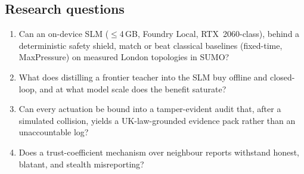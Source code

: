 \subsection{Research questions}\label{sec:intro-rqs}
\begin{enumerate}
\item[\textbf{RQ1}] Can an on-device SLM ($\le$4\,GB, Foundry Local,
RTX~2060-class), behind a deterministic safety shield, match or beat
classical baselines (fixed-time, MaxPressure) on measured London
topologies in SUMO?
\item[\textbf{RQ2}] What does distilling a frontier teacher into the SLM
buy offline and closed-loop, and at what model scale does the benefit
saturate?
\item[\textbf{RQ3}] Can every actuation be bound into a tamper-evident
audit that, after a simulated collision, yields a UK-law-grounded evidence
pack rather than an unaccountable log?
\item[\textbf{RQ4}] Does a trust-coefficient mechanism over neighbour
reports withstand honest, blatant, and stealth misreporting?
\end{enumerate}

